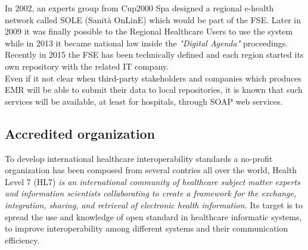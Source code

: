 In 2002, an experts group from Cup2000 Spa designed a regional e-health network called SOLE (Sanità OnLinE) which would be part of the FSE. Later in 2009 it was finally possible to the Regional Healthcare Users to use the system while in 2013 it became national law inside the \textit{"Digital Agenda"} proceedings.\\
Recently in 2015 the FSE has been technically defined and each region started its own repository with the related IT company.
\cite{smarthealth}\\
Even if it not clear when third-party stakeholders and companies which produces EMR will be able to submit their data to local repositories, it is known that such services will be available, at least for hospitals, through SOAP web services.

\subsection{Accredited organization}
To develop international healthcare interoperability standards a no-profit organization has been composed from several contries all over the world, Health Level 7 (HL7) \textit{is an international community of healthcare subject matter experts and information scientists collaborating to create a framework for the exchange, integration, sharing, and retrieval of electronic health information.} Its target is to spread the use and knowledge of open standard in healthcare informatic systems, to improve interoperability among different systems and their communication efficiency. \cite{hl7}


